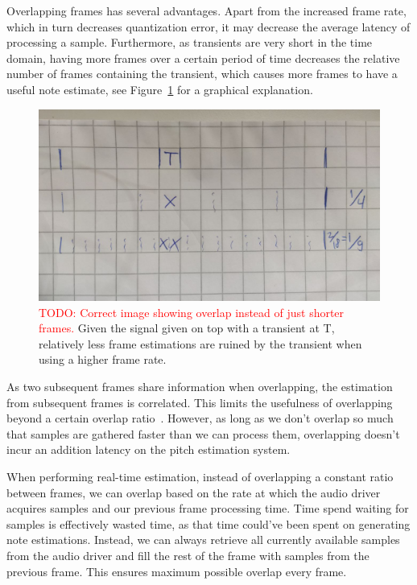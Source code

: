 \documentclass[10pt,twocolumn]{article}
\begin{document}
Overlapping frames has several advantages. Apart from the increased frame rate, which in turn decreases quantization error, it may decrease the average latency of processing a sample. Furthermore, as transients are very short in the time domain, having more frames over a certain period of time decreases the relative number of frames containing the transient, which causes more frames to have a useful note estimate, see Figure~\ref{fig:overlap_transient} for a graphical explanation.
\begin{figure}[h]
    \centering
    \includegraphics[width=\linewidth]{fig/overlap_transient.jpg}
    \caption{\textcolor{red}{TODO: Correct image showing overlap instead of just shorter frames.} Given the signal given on top with a transient at T, relatively less frame estimations are ruined by the transient when using a higher frame rate.}
    \label{fig:overlap_transient}
\end{figure}

As two subsequent frames share information when overlapping, the estimation from subsequent frames is correlated. This limits the usefulness of overlapping beyond a certain overlap ratio~\cite{overlap}. However, as long as we don't overlap so much that samples are gathered faster than we can process them, overlapping doesn't incur an addition latency on the pitch estimation system.

When performing real-time estimation, instead of overlapping a constant ratio between frames, we can overlap based on the rate at which the audio driver acquires samples and our previous frame processing time. Time spend waiting for samples is effectively wasted time, as that time could've been spent on generating note estimations. Instead, we can always retrieve all currently available samples from the audio driver and fill the rest of the frame with samples from the previous frame. This ensures maximum possible overlap every frame.
\end{document}

